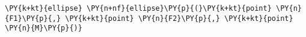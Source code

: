 \begin{Verbatim}[commandchars=\\\{\}]
    \PY{k+kt}{ellipse} \PY{n+nf}{ellipse}\PY{p}{(}\PY{k+kt}{point} \PY{n}{F1}\PY{p}{,} \PY{k+kt}{point} \PY{n}{F2}\PY{p}{,} \PY{k+kt}{point} \PY{n}{M}\PY{p}{)}
\end{Verbatim}
